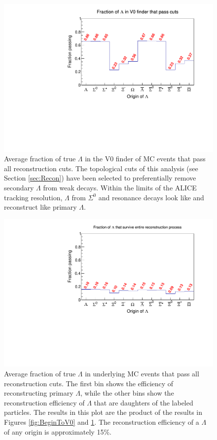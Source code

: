 \begin{figure}[hbtp]
\includegraphics[width=36pc]{Figures/YieldAndEff/2016-08-10-FractionV0FinderToRecon.pdf}
\caption[Topological cut efficiency]{
Average fraction of true $\Lambda$ in the V0 finder of MC events that pass all reconstruction cuts. The topological cuts of this analysis (see Section \ref{sec:Recon}) have been selected to preferentially remove secondary $\Lambda$ from weak decays. Within the limits of the ALICE tracking resolution, $\Lambda$ from $\Sigma^0$ and resonance decays look like and reconstruct like primary $\Lambda$.
}
\label{fig:V0ToRecon}
\end{figure}

\begin{figure}[hbtp]
\includegraphics[width=36pc]{Figures/YieldAndEff/2016-08-10-FractionBeginToRecon.pdf}
\caption[Total reconstruction efficiency]{
Average fraction of true $\Lambda$ in underlying MC events that pass all reconstruction cuts. The first bin shows the efficiency of reconstructing primary $\Lambda$, while the other bins show the reconstruction efficiency of $\Lambda$ that are daughters of the labeled particles. The results in this plot are the product of the results in Figures \ref{fig:BeginToV0} and \ref{fig:V0ToRecon}. The reconstruction efficiency of a $\Lambda$ of any origin is approximately 15\%.
}
\label{fig:BeginToRecon}
\end{figure}

